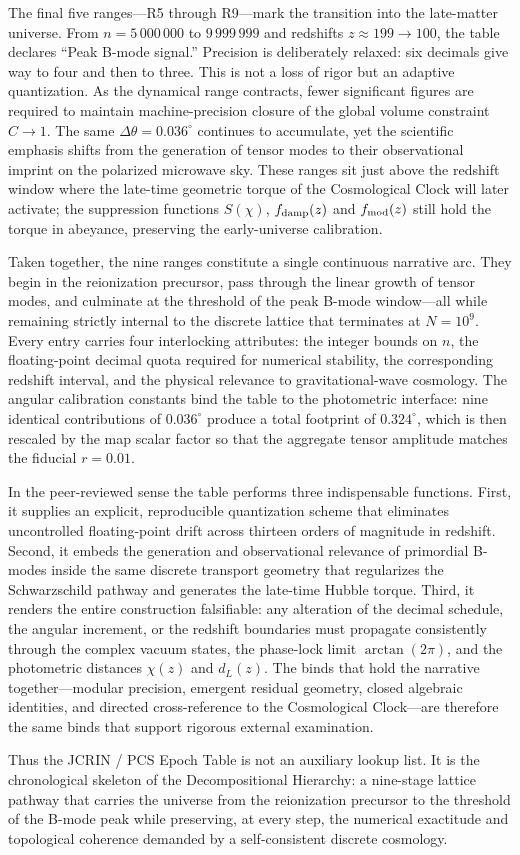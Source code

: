 The final five ranges—R5 through R9—mark the transition into the late-matter universe. From \(n = 5\,000\,000\) to \(9\,999\,999\) and redshifts \(z \approx 199 \to 100\), the table declares “Peak B-mode signal.” Precision is deliberately relaxed: six decimals give way to four and then to three. This is not a loss of rigor but an adaptive quantization. As the dynamical range contracts, fewer significant figures are required to maintain machine-precision closure of the global volume constraint \(C \to 1\). The same \(\Delta\theta = 0.036^\circ\) continues to accumulate, yet the scientific emphasis shifts from the generation of tensor modes to their observational imprint on the polarized microwave sky. These ranges sit just above the redshift window where the late-time geometric torque of the Cosmological Clock will later activate; the suppression functions \(S(\chi)\), \(f_{\rm damp}(z)\) and \(f_{\rm mod}(z)\) still hold the torque in abeyance, preserving the early-universe calibration.

Taken together, the nine ranges constitute a single continuous narrative arc. They begin in the reionization precursor, pass through the linear growth of tensor modes, and culminate at the threshold of the peak B-mode window—all while remaining strictly internal to the discrete lattice that terminates at \(N = 10^9\). Every entry carries four interlocking attributes: the integer bounds on \(n\), the floating-point decimal quota required for numerical stability, the corresponding redshift interval, and the physical relevance to gravitational-wave cosmology. The angular calibration constants bind the table to the photometric interface: nine identical contributions of \(0.036^\circ\) produce a total footprint of \(0.324^\circ\), which is then rescaled by the map scalar factor so that the aggregate tensor amplitude matches the fiducial \(r = 0.01\).

In the peer-reviewed sense the table performs three indispensable functions. First, it supplies an explicit, reproducible quantization scheme that eliminates uncontrolled floating-point drift across thirteen orders of magnitude in redshift. Second, it embeds the generation and observational relevance of primordial B-modes inside the same discrete transport geometry that regularizes the Schwarzschild pathway and generates the late-time Hubble torque. Third, it renders the entire construction falsifiable: any alteration of the decimal schedule, the angular increment, or the redshift boundaries must propagate consistently through the complex vacuum states, the phase-lock limit \(\arctan(2\pi)\), and the photometric distances \(\chi(z)\) and \(d_L(z)\). The binds that hold the narrative together—modular precision, emergent residual geometry, closed algebraic identities, and directed cross-reference to the Cosmological Clock—are therefore the same binds that support rigorous external examination.

Thus the JCRIN / PCS Epoch Table is not an auxiliary lookup list. It is the chronological skeleton of the Decompositional Hierarchy: a nine-stage lattice pathway that carries the universe from the reionization precursor to the threshold of the B-mode peak while preserving, at every step, the numerical exactitude and topological coherence demanded by a self-consistent discrete cosmology.
